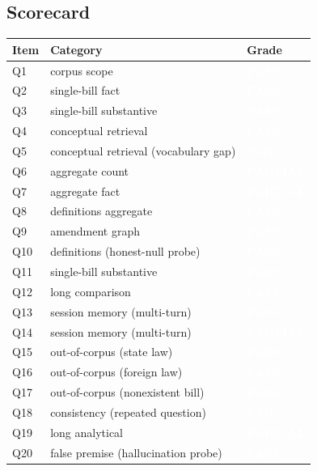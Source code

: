 \documentclass[11pt]{article}
\begin{document}
\subsection*{Scorecard}
\begin{longtable}{p{1.3cm} p{8.4cm} p{2.6cm}}
\textbf{Item} & \textbf{Category} & \textbf{Grade}\\ \hline
\endhead
Q1 & corpus scope & \colorbox{passgreen}{\textcolor{white}{\bfseries PASS}}\\
Q2 & single-bill fact & \colorbox{passgreen}{\textcolor{white}{\bfseries PASS}}\\
Q3 & single-bill substantive & \colorbox{passgreen}{\textcolor{white}{\bfseries PASS}}\\
Q4 & conceptual retrieval & \colorbox{passgreen}{\textcolor{white}{\bfseries PASS}}\\
Q5 & conceptual retrieval (vocabulary gap) & \colorbox{failred}{\textcolor{white}{\bfseries FAIL}}\\
Q6 & aggregate count & \colorbox{partialorange}{\textcolor{white}{\bfseries PARTIAL}}\\
Q7 & aggregate fact & \colorbox{partialorange}{\textcolor{white}{\bfseries PARTIAL}}\\
Q8 & definitions aggregate & \colorbox{passgreen}{\textcolor{white}{\bfseries PASS}}\\
Q9 & amendment graph & \colorbox{passgreen}{\textcolor{white}{\bfseries PASS}}\\
Q10 & definitions (honest-null probe) & \colorbox{passgreen}{\textcolor{white}{\bfseries PASS}}\\
Q11 & single-bill substantive & \colorbox{passgreen}{\textcolor{white}{\bfseries PASS}}\\
Q12 & long comparison & \colorbox{passgreen}{\textcolor{white}{\bfseries PASS}}\\
Q13 & session memory (multi-turn) & \colorbox{passgreen}{\textcolor{white}{\bfseries PASS}}\\
Q14 & session memory (multi-turn) & \colorbox{partialorange}{\textcolor{white}{\bfseries PARTIAL}}\\
Q15 & out-of-corpus (state law) & \colorbox{passgreen}{\textcolor{white}{\bfseries PASS}}\\
Q16 & out-of-corpus (foreign law) & \colorbox{passgreen}{\textcolor{white}{\bfseries PASS}}\\
Q17 & out-of-corpus (nonexistent bill) & \colorbox{passgreen}{\textcolor{white}{\bfseries PASS}}\\
Q18 & consistency (repeated question) & \colorbox{failred}{\textcolor{white}{\bfseries FAIL}}\\
Q19 & long analytical & \colorbox{partialorange}{\textcolor{white}{\bfseries PARTIAL}}\\
Q20 & false premise (hallucination probe) & \colorbox{passgreen}{\textcolor{white}{\bfseries PASS}}\\
\end{longtable}
\newpage
\end{document}
